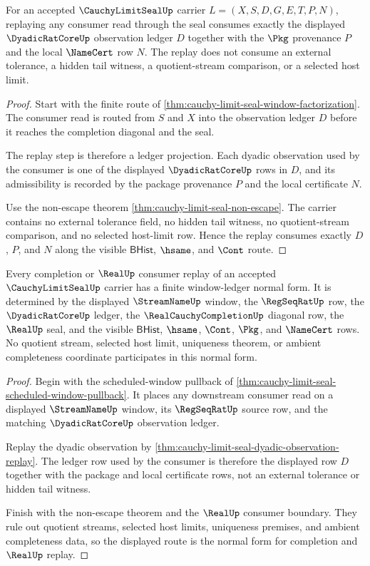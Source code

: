 \begin{theorem}
\label{thm:cauchy-limit-seal-dyadic-observation-replay}
For an accepted $\CauchyLimitSealUp$ carrier $L=(X,S,D,G,E,T,P,N)$, replaying any consumer read through the seal consumes exactly the displayed $\DyadicRatCoreUp$ observation ledger $D$ together with the $\Pkg$ provenance $P$ and the local $\NameCert$ row $N$. The replay does not consume an external tolerance, a hidden tail witness, a quotient-stream comparison, or a selected host limit.
\end{theorem}
\begin{proof}
Start with the finite route of \autoref{thm:cauchy-limit-seal-window-factorization}. The consumer read is routed from $S$ and $X$ into the observation ledger $D$ before it reaches the completion diagonal and the seal.

The replay step is therefore a ledger projection. Each dyadic observation used by the consumer is one of the displayed $\DyadicRatCoreUp$ rows in $D$, and its admissibility is recorded by the package provenance $P$ and the local certificate $N$.

Use the non-escape theorem \autoref{thm:cauchy-limit-seal-non-escape}. The carrier contains no external tolerance field, no hidden tail witness, no quotient-stream comparison, and no selected host-limit row. Hence the replay consumes exactly $D$, $P$, and $N$ along the visible $\mathsf{BHist}$, $\hsame$, and $\Cont$ route.
\end{proof}

\begin{theorem}
\label{thm:cauchy-limit-seal-window-ledger-normal-form}
Every completion or $\RealUp$ consumer replay of an accepted $\CauchyLimitSealUp$ carrier has a finite window-ledger normal form. It is determined by the displayed $\StreamNameUp$ window, the $\RegSeqRatUp$ row, the $\DyadicRatCoreUp$ ledger, the $\RealCauchyCompletionUp$ diagonal row, the $\RealUp$ seal, and the visible $\mathsf{BHist}$, $\hsame$, $\Cont$, $\Pkg$, and $\NameCert$ rows. No quotient stream, selected host limit, uniqueness theorem, or ambient completeness coordinate participates in this normal form.
\end{theorem}
\begin{proof}
Begin with the scheduled-window pullback of \autoref{thm:cauchy-limit-seal-scheduled-window-pullback}. It places any downstream consumer read on a displayed $\StreamNameUp$ window, its $\RegSeqRatUp$ source row, and the matching $\DyadicRatCoreUp$ observation ledger.

Replay the dyadic observation by \autoref{thm:cauchy-limit-seal-dyadic-observation-replay}. The ledger row used by the consumer is therefore the displayed row $D$ together with the package and local certificate rows, not an external tolerance or hidden tail witness.

Finish with the non-escape theorem and the $\RealUp$ consumer boundary. They rule out quotient streams, selected host limits, uniqueness premises, and ambient completeness data, so the displayed route is the normal form for completion and $\RealUp$ replay.
\end{proof}

